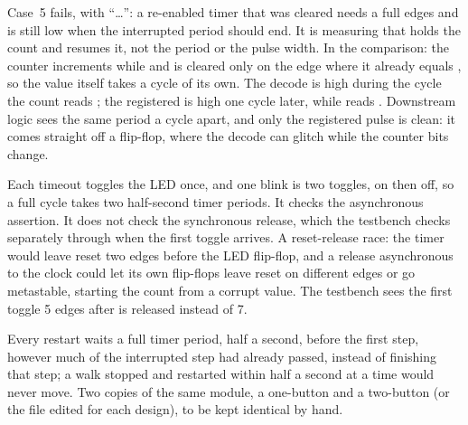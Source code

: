 Case~5 fails, with ``\ldots'': a re-enabled timer that was cleared needs a full  edges
and is still low when the interrupted period should end. It is measuring that  holds
the count and resumes it, not the period or the pulse width.
In the comparison: the counter increments while  and
is cleared only on the edge where it already equals , so the value
 itself takes a cycle of its own.
The decode is high during the cycle the count reads
; the registered  is high one cycle later, while  reads
. Downstream logic sees the same period a cycle apart, and only the registered pulse is
clean: it comes straight off a flip-flop, where the decode can glitch while the counter bits change.

Each timeout toggles the LED once, and one blink is two toggles,
on then off, so a full cycle takes two half-second timer periods.
It checks the asynchronous assertion. It does not check the
synchronous release, which the testbench checks separately through when the first toggle arrives.
A reset-release race: the timer would leave reset two edges before
the LED flip-flop, and a release asynchronous to the clock could let its own flip-flops leave reset
on different edges or go metastable, starting the count from a corrupt value. The testbench sees
the first toggle 5 edges after  is released instead of 7.

Every restart waits a full timer period, half a second, before the first
step, however much of the interrupted step had already passed, instead of finishing that step; a
walk stopped and restarted within half a second at a time would never move.
Two copies of the same module, a one-button and a two-button
 (or the file edited for each design), to be kept identical by hand.

